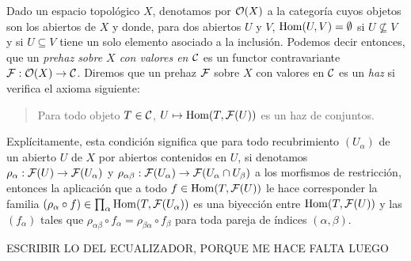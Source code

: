 \documentclass[twoside]{article}
\begin{document}
\begin{defi}\label{axioma}
Dado un espacio topológico $X$, denotamos por ${\mathcal O}(X)$ a la categoría cuyos objetos son los abiertos de $X$ y donde, para dos abiertos $U$ y $V$, $\operatorname{Hom}(U,V)=\emptyset$ si $U\not\subseteq V$ y si $U\subseteq V$ tiene un solo elemento asociado a la inclusión. Podemos decir entonces, que un \emph{prehaz sobre $X$ con valores en ${\mathcal C}$} es un functor contravariante $\mathcal{F}:{\mathcal O}(X)\to{\mathcal C}$. Diremos que un prehaz $\mathcal{F}$ sobre $X$ con valores en ${\mathcal C}$ es un \emph{haz} si verifica el axioma siguiente:

\begin{verse}
Para todo objeto $T\in{\mathcal C}$, $U\mapsto\operatorname{Hom}(T,\mathcal{F}(U))$ es un haz de conjuntos. %
\end{verse}

Explícitamente, esta condición significa que para todo recubrimiento $(U_\alpha)$ de un abierto $U$ de $X$ por abiertos contenidos en $U$, si denotamos $\rho_\alpha:\mathcal{F}(U)\to\mathcal{F}(U_\alpha)$ y $\rho_{\alpha\beta}:\mathcal{F}(U_\alpha)\to\mathcal{F}(U_\alpha\cap U_\beta)$ a los morfismos de restricción, entonces la aplicación que a todo $f\in\operatorname{Hom}(T,\mathcal{F}(U))$ le hace corresponder la familia $(\rho_\alpha\circ f)\in \prod_\alpha\operatorname{Hom}(T,\mathcal{F}(U_\alpha))$ es una biyección entre $\operatorname{Hom}(T,\mathcal{F}(U))$ y las $(f_\alpha)$ tales que $\rho_{\alpha\beta}\circ f_\alpha=\rho_{\beta\alpha}\circ f_\beta$ para toda pareja de índices $(\alpha,\beta)$. 


ESCRIBIR LO DEL ECUALIZADOR, PORQUE ME HACE FALTA LUEGO
\end{defi}
\end{document}
